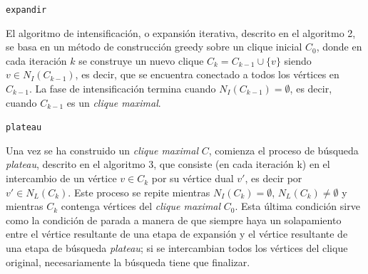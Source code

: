 \documentclass[conference]{IEEEtran}
\begin{document}
\begin{scriptsize}
\LinesNumbered
\begin{algoritmo}[htp]
\label{dls:algo}

 \caption{\texttt{expandir}}
  \DontPrintSemicolon
\end{algoritmo}
\end{scriptsize}

El algoritmo de intensificación, o expansión iterativa, descrito en el
algoritmo 2, se basa en un método de construcción greedy sobre un
clique inicial $C_0$, donde en cada iteración $k$ se construye un
nuevo clique $C_k = C_{k-1} \cup \lbrace v \rbrace$ siendo $v \in
N_I(C_{k-1})$, es decir, que se encuentra conectado a todos los
vértices en $C_{k-1}$.  La fase de intensificación termina cuando
$N_I(C_{k-1}) = \emptyset$, es decir, cuando $C_{k-1}$ es un
\emph{clique maximal}.


\begin{scriptsize}
\LinesNumbered
\begin{algoritmo}[htp]
\label{dls:algo}
 \caption{\texttt{plateau}}
  \DontPrintSemicolon
\end{algoritmo}
\end{scriptsize}

Una vez se ha construido un \emph{clique maximal} $C$, comienza el
proceso de búsqueda \emph{plateau}, descrito en el algoritmo 3, que
consiste (en cada iteración k) en el intercambio de un vértice $v \in
C_k$ por su vértice dual $v'$, es decir por $v' \in N_L(C_k)$. Este
proceso se repite mientras $N_I(C_k) = \emptyset$, $N_L(C_k) \neq
\emptyset$ y mientras $C_k$ contenga vértices del \emph{clique
  maximal} $C_0$. Esta última condición sirve como la condición de
parada a manera de que siempre haya un solapamiento entre el vértice
resultante de una etapa de expansión y el vértice resultante de una
etapa de búsqueda \emph{plateau}; si se intercambian todos los
vértices del clique original, necesariamente la búsqueda tiene que
finalizar.
\end{document}
